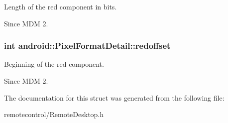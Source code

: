 \-Length of the red component in bits. 

\begin{DoxySince}{\-Since}
\-M\-D\-M 2. 
\end{DoxySince}
\hypertarget{structandroid_1_1PixelFormatDetail_af6a4d67b216877b4b37db9ecef5a85a9}{
\subsubsection[{redoffset}]{\setlength{\rightskip}{0pt plus 5cm}int {\bf android\-::\-Pixel\-Format\-Detail\-::redoffset}}}\label{structandroid_1_1PixelFormatDetail_af6a4d67b216877b4b37db9ecef5a85a9}


\-Beginning of the red component. 

\begin{DoxySince}{\-Since}
\-M\-D\-M 2. 
\end{DoxySince}


\-The documentation for this struct was generated from the following file\-:\begin{DoxyCompactItemize}
\item 
remotecontrol/\-Remote\-Desktop.\-h\end{DoxyCompactItemize}
